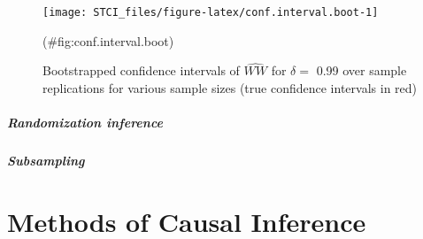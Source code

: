 \documentclass[]{book}
\newenvironment{Shaded}{\begin{snugshade}}{\end{snugshade}}
\newcommand{\DataTypeTok}[1]{\textcolor[rgb]{0.13,0.29,0.53}{#1}}
\newcommand{\DecValTok}[1]{\textcolor[rgb]{0.00,0.00,0.81}{#1}}
\newcommand{\KeywordTok}[1]{\textcolor[rgb]{0.13,0.29,0.53}{\textbf{#1}}}
\newcommand{\NormalTok}[1]{#1}
\newcommand{\OperatorTok}[1]{\textcolor[rgb]{0.81,0.36,0.00}{\textbf{#1}}}
\newcommand{\StringTok}[1]{\textcolor[rgb]{0.31,0.60,0.02}{#1}}
\theoremstyle{definition}
\theoremstyle{definition}
\theoremstyle{definition}
\theoremstyle{remark}
\begin{document}
\begin{Shaded}
\end{Shaded}

\begin{figure}[htbp]

{\centering \texttt{[image: STCI\_files/figure-latex/conf.interval.boot-1]} 

}

\caption{Bootstrapped confidence intervals of $\hat{WW}$ for $\delta=$ 0.99 over sample replications for various sample sizes (true confidence intervals in red)}(\#fig:conf.interval.boot)
\end{figure}

\hypertarget{randomization-inference}{%
\subsubsection{Randomization inference}\label{randomization-inference}}

\hypertarget{subsampling}{%
\subsubsection{Subsampling}\label{subsampling}}

\hypertarget{part-methods-of-causal-inference}{%
\part{Methods of Causal Inference}\label{part-methods-of-causal-inference}}
\end{document}
